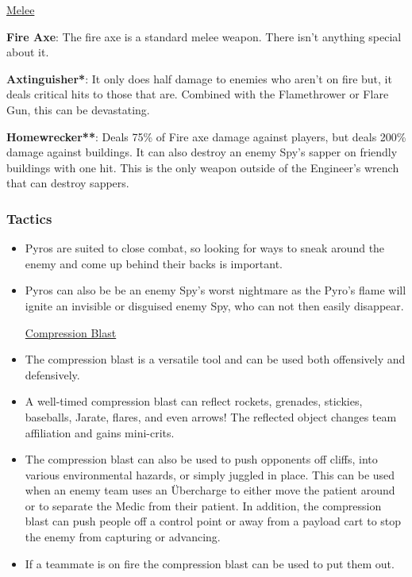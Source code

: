\newpage

\begin {center}
\underline {Melee}
\end {center}

{\bf Fire Axe}: The fire axe is a standard melee weapon.  There isn't anything special about it.

{\bf Axtinguisher*}: It only does half damage to enemies who aren't on fire but, it deals critical hits to those that are. Combined with the Flamethrower or Flare Gun, this can be devastating. 

{\bf Homewrecker**}: Deals 75\% of Fire axe damage against players, but deals 200\% damage against buildings. It can also destroy an enemy Spy's sapper on friendly buildings with one hit. This is the only weapon outside of the Engineer's wrench that can destroy sappers.


\subsubsection {Tactics}
\begin {itemize}
\item Pyros are suited to close combat, so looking for ways to sneak around the enemy and come up behind their backs is important.

\item Pyros can also be be an enemy Spy's worst nightmare as the Pyro's flame will ignite an invisible or disguised enemy Spy, who can not then easily disappear.
\begin {center}
\underline {Compression Blast}
\end {center}
\item The compression blast is a versatile tool and can be used both offensively and defensively.

\item A well-timed compression blast can reflect rockets, grenades, stickies, baseballs, Jarate, flares, and even arrows! The reflected object changes team affiliation and gains mini-crits.

\item The compression blast can also be used to push opponents off cliffs, into various environmental hazards, or simply juggled in place. This can be used when an enemy team uses an Übercharge to either move the patient around or to separate the Medic from their patient. In addition, the compression blast can push people off a control point or away from a payload cart to stop the enemy from capturing or advancing.

\item If a teammate is on fire the compression blast can be used to put them out.
\end {itemize}